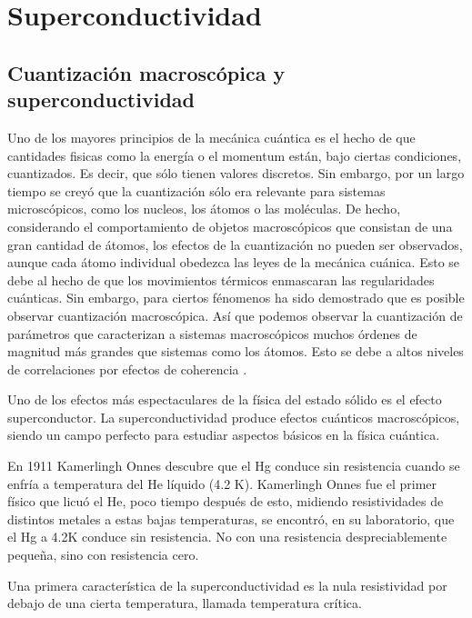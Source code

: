 \chapter{Superconductividad}

\section{Cuantización macroscópica y superconductividad}

Uno de los mayores principios de la mecánica cuántica es el hecho de que cantidades fisicas como la energía o el momentum están, bajo ciertas condiciones, cuantizados. Es decir, que sólo tienen valores discretos. Sin embargo, por un largo tiempo se creyó que la cuantización sólo era relevante para sistemas microscópicos, como los nucleos, los átomos o las moléculas. De hecho, considerando el comportamiento de objetos macroscópicos que consistan de una gran cantidad de átomos, los efectos de la cuantización no pueden ser observados, aunque cada átomo individual obedezca las leyes de la mecánica cuánica. Esto se debe al hecho de que los movimientos térmicos enmascaran las regularidades cuánticas. Sin embargo, para ciertos fénomenos ha sido demostrado que es posible observar cuantización macroscópica. Así que podemos observar la cuantización de parámetros que caracterizan a sistemas macroscópicos muchos órdenes de magnitud más grandes que sistemas como los átomos. Esto se debe a altos niveles de correlaciones por efectos de coherencia \cite{gross}.

Uno de los efectos más espectaculares de la física del estado sólido es el efecto superconductor. La superconductividad produce efectos cuánticos macroscópicos, siendo un campo perfecto para estudiar aspectos básicos en la física cuántica.

En 1911 Kamerlingh Onnes \cite{onnes} descubre que el Hg conduce sin resistencia cuando se enfría a temperatura del He líquido (4.2 K). Kamerlingh Onnes fue el primer físico que licuó el He, poco tiempo después de esto, midiendo resistividades de distintos metales a estas bajas temperaturas, se encontró, en su laboratorio, que el Hg a 4.2K conduce sin resistencia. No con una resistencia despreciablemente pequeña, sino con resistencia cero.

Una primera característica de la superconductividad es la nula resistividad por debajo de una cierta temperatura, llamada temperatura crítica.

